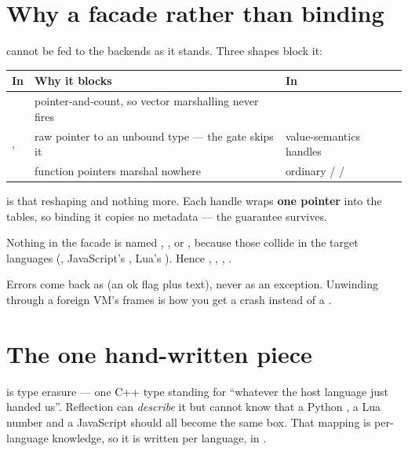 \section{Why a facade rather than binding }

 cannot be fed to the backends as it stands. Three shapes
block it:

\begin{center}
\small
\begin{tabular}{@{}L{3.9cm}L{4.6cm}L{4.5cm}@{}}
\toprule
\textbf{In } & \textbf{Why it blocks} & \textbf{In
  } \\
\midrule
{} &
  pointer-and-count, so vector marshalling never fires &
   \\
\addlinespace
{},  &
  raw pointer to an unbound type --- the gate skips it &
  value-semantics handles \\
\addlinespace
{} &
  function pointers marshal nowhere &
  ordinary  /  /  \\
\bottomrule
\end{tabular}
\end{center}

 is that reshaping and nothing more. Each handle wraps
\textbf{one  pointer} into the tables, so binding it copies no
metadata --- the  guarantee survives.

\begin{note}
Nothing in the facade is named , ,  or
, because those collide in the target languages
(, JavaScript's , Lua's ). Hence
, , , .
\end{note}

Errors come back as  (an ok flag plus text), never as an
exception. Unwinding through a foreign VM's frames is how you get a crash
instead of a .

\section{The one hand-written piece}

 is type erasure --- one C++ type standing for ``whatever the host
language just handed us''. Reflection can \emph{describe} it but cannot know
that a Python , a Lua number and a JavaScript  should
all become the same box. That mapping is per-language knowledge, so it is
written per language, in
.

